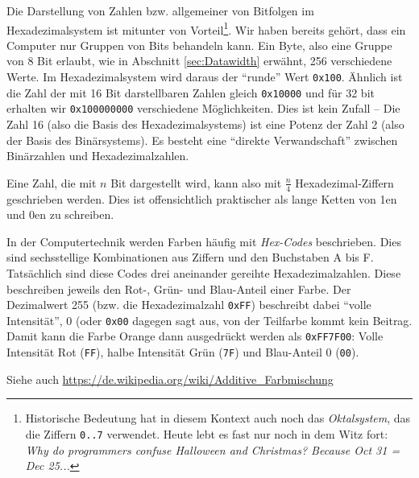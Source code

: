 Die Darstellung von Zahlen bzw. allgemeiner von Bitfolgen im Hexadezimalsystem ist mitunter von Vorteil\footnote{Historische Bedeutung hat in diesem Kontext auch noch das \emph{Oktalsystem}, das die Ziffern \texttt{0..7} verwendet. Heute lebt es fast nur noch in dem Witz fort: \emph{Why do programmers confuse Halloween and Christmas? Because Oct 31 = Dec 25...}}. Wir haben bereits gehört, dass ein Computer nur Gruppen von Bits behandeln kann. Ein Byte, also eine Gruppe von 8 Bit erlaubt, wie in Abschnitt \ref{sec:Datawidth} erwähnt, 256 verschiedene Werte. Im Hexadezimalsystem wird daraus der \enquote{runde} Wert \texttt{0x100}. Ähnlich ist die Zahl der mit 16 Bit darstellbaren Zahlen gleich \texttt{0x10000} und für 32 bit erhalten wir \texttt{0x100000000} verschiedene Möglichkeiten. Dies ist kein Zufall -- Die Zahl 16 (also die Basis des Hexadezimalsystems) ist eine Potenz der Zahl 2 (also der Basis des Binärsystems). Es besteht eine \enquote{direkte Verwandschaft} zwischen Binärzahlen und Hexadezimalzahlen.

Eine Zahl, die mit $n$ Bit dargestellt wird, kann also mit $\frac{n}{4}$ Hexadezimal-Ziffern geschrieben werden. Dies ist offensichtlich praktischer als lange Ketten von 1en und 0en zu schreiben.

\begin{hintbox}
In der Computertechnik werden Farben häufig mit \emph{Hex-Codes} beschrieben. Dies sind sechsstellige Kombinationen aus Ziffern und den Buchstaben A bis F. Tatsächlich sind diese Codes drei aneinander gereihte Hexadezimalzahlen. Diese beschreiben jeweils den Rot-, Grün- und Blau-Anteil einer Farbe. Der Dezimalwert 255 (bzw. die Hexadezimalzahl \texttt{0xFF}) beschreibt dabei \enquote{volle Intensität}, 0 (oder \texttt{0x00} dagegen sagt aus, von der Teilfarbe kommt kein Beitrag. Damit kann die Farbe Orange dann ausgedrückt werden als \texttt{0xFF7F00}: Volle Intensität Rot (\texttt{FF}), halbe Intensität Grün (\texttt{7F}) und Blau-Anteil 0 (\texttt{00}).

Siehe auch \url{https://de.wikipedia.org/wiki/Additive_Farbmischung}
\end{hintbox}

